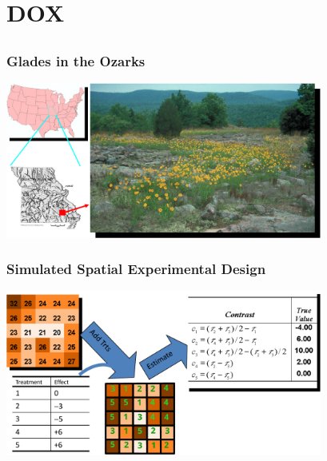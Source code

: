 \documentclass[mathserif,compress]{beamer}\usepackage{graphicx, color}
\begin{document}

\section{DOX}
\subsection{}
\begin{frame} 
\frametitle{Glades in the Ozarks}
     
		\begin{center}
		  \vspace{-.5cm}
			\includegraphics[width=10.4cm]{figure/OzarkDesign1Crop.pdf} 
		\end{center} 

\end{frame}


\begin{frame} 
\frametitle{Simulated Spatial Experimental Design}
     
		\begin{center}
		  \vspace{-.5cm}
			\includegraphics[width=10.4cm]{figure/OzarkDesign2Crop.pdf} 
		\end{center} 

\end{frame}
\end{document}
